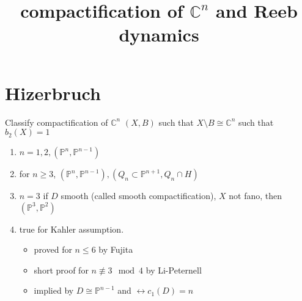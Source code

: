 \documentclass{article}
\title{compactification of $\mathbb{C}^{n}$ and Reeb dynamics}
\author{}
\begin{document}
\maketitle
\section{Hizerbruch}
Classify compactification of $\mathbb{C}^{n}$
$(X,B)$ such that $ X \setminus B \cong \mathbb{C}^{n} $   such that $ b_{2}(X)=1  $
\begin{enumerate}
  \item $ n=1,2, (\mathbb{P}^{n},\mathbb{P}^{n-1}) $
  \item for $ n \geqslant 3 $, $ (\mathbb{P}^{n},\mathbb{P}^{n-1}),(Q_{n} \subset \mathbb{P}^{n+1},Q_{n} \cap  H) $
  \item $ n=3 $ if $D$ smooth (called smooth compactification), $X$ not fano, then $ (\mathbb{P}^{3},\mathbb{P}^{2}) $  
  \item true for Kahler assumption.
    \begin{itemize}
      \item proved for $ n\le 6 $ by Fujita
      \item short proof for $ n \not \equiv 3 \mod 4 $ by Li-Peternell
      \item implied by $ D \cong \mathbb{P}^{n-1} $ and $ \leftrightarrow c_{1}(D)=n $ 
    \end{itemize}
\end{enumerate}
\end{document}
